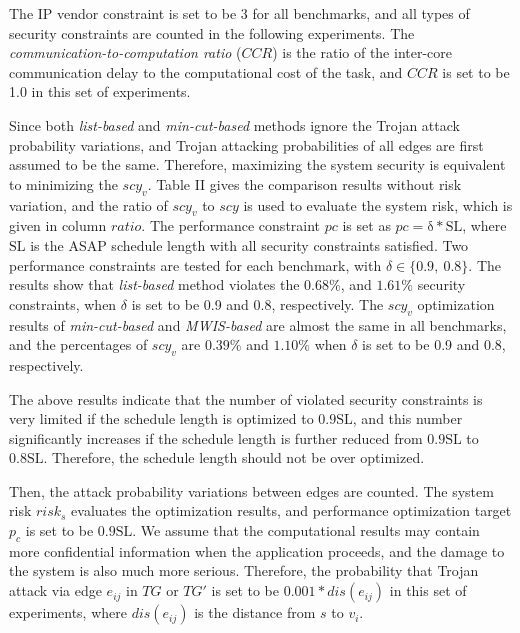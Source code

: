 \documentclass[10pt,journal]{IEEEtran}
\begin{document}
The IP vendor constraint is set to be 3 for all benchmarks, and all types of security constraints are counted in the following experiments. The \textit{communication-to-computation ratio} ($CCR$) is the ratio of the inter-core communication delay to the computational cost of the task, and $CCR$ is set to be 1.0 in this set of experiments.

Since both \textit{list-based} and \textit{min-cut-based} methods ignore the Trojan attack probability variations, and Trojan attacking probabilities of all edges are first assumed to be the same. Therefore, maximizing the system security is equivalent to minimizing the $scy_v$. Table II gives the comparison results without risk variation, and the ratio of $scy_v$ to $scy$ is used to evaluate the system risk, which is given in column $ratio$. The performance constraint $pc$ is set as $pc=\mathrm{\delta*SL}$, where $\mathrm{SL}$ is the ASAP schedule length with all security constraints satisfied. Two performance constraints are tested for each benchmark, with $\delta \in \{0.9, ~0.8\}$. The results show that \textit{list-based} method violates the $0.68\%$, and $1.61\%$ security constraints, when $\delta$ is set to be 0.9 and 0.8, respectively. The $scy_v$ optimization results of \textit{min-cut-based} and \textit{MWIS-based} are almost the same in all benchmarks, and the percentages of $scy_v$ are $0.39\%$ and $1.10\%$ when $\delta$ is set to be 0.9 and 0.8, respectively.

The above results indicate that the number of violated security constraints is very limited if the schedule length is optimized to $0.9\mathrm{SL}$, and this number significantly increases if the schedule length is further reduced from $0.9\mathrm{SL}$ to $0.8\mathrm{SL}$. Therefore, the schedule length should not be over optimized.

Then, the attack probability variations between edges are counted. The system risk $risk_s$ evaluates the optimization results, and performance optimization target $p_c$ is set to be $0.9\mathrm{SL}$. We assume that the computational results may contain more confidential information when the application proceeds, and the damage to the system is also much more serious. Therefore, the probability that Trojan attack via edge $e_{ij}$ in $TG$ or $TG'$ is set to be $0.001*dis(e_{ij})$ in this set of experiments, where $dis(e_{ij})$ is the distance from $s$ to $v_i$.
\end{document}
